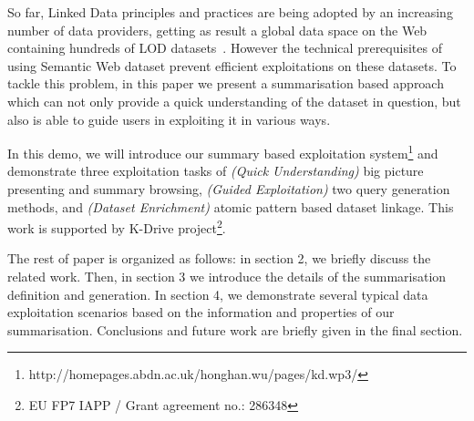 So far, Linked Data principles and practices are being adopted by an increasing number of data providers, getting as result a global data space on the Web containing hundreds of LOD datasets~\cite{bizer2009linked}. However the technical prerequisites of using Semantic Web dataset prevent efficient exploitations on these datasets. To tackle this problem, in this paper we present a summarisation based approach which can not only provide a quick understanding of the dataset in question, but also is able to guide users in exploiting it in various ways.

In this demo, we will introduce our summary based exploitation system\footnote{http://homepages.abdn.ac.uk/honghan.wu/pages/kd.wp3/} and demonstrate three exploitation tasks of \emph{(Quick Understanding)} big picture presenting and summary browsing, \emph{(Guided Exploitation)} two query generation methods, and \emph{(Dataset Enrichment)} atomic pattern based dataset linkage. This work is supported by K-Drive project\footnote{ EU FP7 IAPP / Grant agreement no.: 286348}.

The rest of paper is organized as follows: in section 2, we briefly discuss the related work. Then, in section 3 we  introduce the details of the summarisation definition and generation. In section 4, we demonstrate several typical data exploitation scenarios based on the information and properties of our summarisation. Conclusions and future work are briefly given in the final section.
